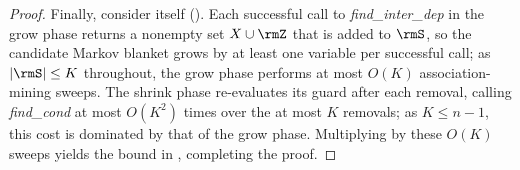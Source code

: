 \begin{proof}
  Finally, consider {\method} itself (). Each successful
  call to \textit{find\_inter\_dep} in the grow phase returns a
  nonempty set $X\cup\rmZ$ that is added to $\rmS$, so the candidate
  Markov blanket grows by at least one variable per successful call; as
  $|\rmS|\leq K$ throughout, the grow phase performs at most $O(K)$
  association-mining sweeps. The shrink phase re-evaluates its guard after
  each removal, calling \textit{find\_cond} at most $O(K^{2})$ times over the
  at most $K$ removals; as $K\leq n-1$, this cost is dominated by that of the
  grow phase. Multiplying 
  by these $O(K)$ sweeps yields the bound in ,
  completing the proof.
\end{proof}




